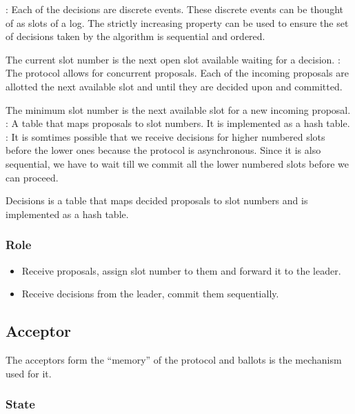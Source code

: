 \begin{itemize}
    : Each of the decisions are discrete events. 
    These discrete events can be thought of as slots of a log. The strictly
    increasing property can be used to ensure the set of decisions taken by
    the algorithm is sequential and ordered.

    The current slot number is the next open slot available waiting for a
    decision.
    : The protocol allows for concurrent proposals.
    Each of the incoming proposals are allotted the next available slot and
    until they are decided upon and committed.

    The minimum slot number is the next available slot for a new incoming
    proposal.
    : A table that maps proposals to slot numbers. It is
    implemented as a hash table.
    : It is somtimes possible that we receive decisions for
    higher numbered slots before the lower ones because the protocol is
    asynchronous. Since it is also sequential, we have to wait till we
    commit all the lower numbered slots before we can proceed.

   Decisions is a table that maps decided proposals to slot numbers and is
   implemented as a hash table.
\end{itemize}

\subsubsection{Role}

\begin{itemize}
  \item Receive proposals, assign slot number to them and forward it to the 
    leader.
  \item Receive decisions from the leader, commit them sequentially.
\end{itemize}

\subsection{Acceptor}

The acceptors form the ``memory'' of the protocol and ballots is the
mechanism used for it.

\subsubsection{State}

